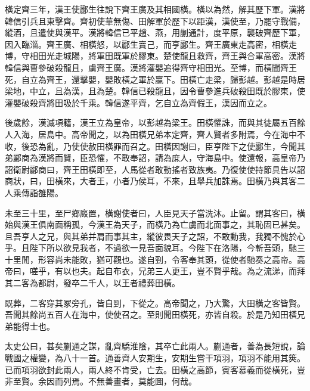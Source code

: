 橫定齊三年，漢王使酈生往說下齊王廣及其相國橫。橫以為然，解其歷下軍。漢將韓信引兵且東擊齊。齊初使華無傷、田解軍於歷下以距漢，漢使至，乃罷守戰備，縱酒，且遣使與漢平。漢將韓信已平趙、燕，用蒯通計，度平原，襲破齊歷下軍，因入臨淄。齊王廣、相橫怒，以酈生賣己，而亨酈生。齊王廣東走高密，相橫走博，守相田光走城陽，將軍田既軍於膠東。楚使龍且救齊，齊王與合軍高密。漢將韓信與曹參破殺龍且，虜齊王廣。漢將灌嬰追得齊守相田光。至博，而橫聞齊王死，自立為齊王，還擊嬰，嬰敗橫之軍於嬴下。田橫亡走梁，歸彭越。彭越是時居梁地，中立，且為漢，且為楚。韓信已殺龍且，因令曹參進兵破殺田既於膠東，使灌嬰破殺齊將田吸於千乘。韓信遂平齊，乞自立為齊假王，漢因而立之。

後歲餘，漢滅項籍，漢王立為皇帝，以彭越為梁王。田橫懼誅，而與其徒屬五百餘人入海，居島中。高帝聞之，以為田橫兄弟本定齊，齊人賢者多附焉，今在海中不收，後恐為亂，乃使使赦田橫罪而召之。田橫因謝曰，臣亨陛下之使酈生，今聞其弟酈商為漢將而賢，臣恐懼，不敢奉詔，請為庶人，守海島中。使還報，高皇帝乃詔衛尉酈商曰，齊王田橫即至，人馬從者敢動搖者致族夷。乃復使使持節具告以詔商狀，曰，田橫來，大者王，小者乃侯耳，不來，且舉兵加誅焉。田橫乃與其客二人乘傳詣雒陽。

未至三十里，至尸鄉廄置，橫謝使者曰，人臣見天子當洗沐。止留。謂其客曰，橫始與漢王俱南面稱孤，今漢王為天子，而橫乃為亡虜而北面事之，其恥固已甚矣。且吾亨人之兄，與其弟并肩而事其主，縱彼畏天子之詔，不敢動我，我獨不愧於心乎。且陛下所以欲見我者，不過欲一見吾面貌耳。今陛下在洛陽，今斬吾頭，馳三十里閒，形容尚未能敗，猶可觀也。遂自剄，令客奉其頭，從使者馳奏之高帝。高帝曰，嗟乎，有以也夫。起自布衣，兄弟三人更王，豈不賢乎哉。為之流涕，而拜其二客為都尉，發卒二千人，以王者禮葬田橫。

既葬，二客穿其冢旁孔，皆自剄，下從之。高帝聞之，乃大驚，大田橫之客皆賢。吾聞其餘尚五百人在海中，使使召之。至則聞田橫死，亦皆自殺。於是乃知田橫兄弟能得士也。

太史公曰，甚矣蒯通之謀，亂齊驕淮陰，其卒亡此兩人。蒯通者，善為長短說，論戰國之權變，為八十一首。通善齊人安期生，安期生嘗干項羽，項羽不能用其筴。已而項羽欲封此兩人，兩人終不肯受，亡去。田橫之高節，賓客慕義而從橫死，豈非至賢。余因而列焉。不無善畫者，莫能圖，何哉。